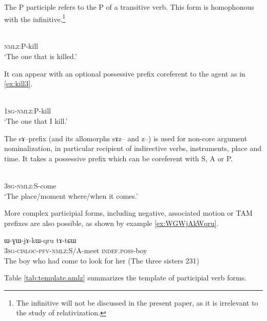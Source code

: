 \documentclass[oldfontcommands,oneside,a4paper,11pt]{article}
\newcommand{\ipa}[1]{{\phon #1}} %
\begin{document}
The P participle refers to the P of a transitive verb. This form is homophonous with the infinitive.\footnote{The infinitive will not be discussed in the present paper, as it is irrelevant to the study of relativization.}

 \begin{exe} 
\ex \label{ex:kill2}
\gll \ipa{kɤ-sat}    \\
   \textsc{nmlz}:P-kill \\
 \glt  `The one that is killed.'
 \end{exe}
 
It can appear with an optional possessive prefix coreferent to the agent as in \ref{ex:kill3}.
  
  \begin{exe}
\ex \label{ex:kill3}
\gll \ipa{a-kɤ-sat}    \\
   \textsc{1sg-nmlz}:P-kill \\
 \glt  `The one that I kill.'
 \end{exe}

The \ipa{sɤ}--prefix (and its allomorphs \ipa{sɤz}-- and \ipa{z}--) is used for non-core argument nominalization, in particular   recipient of indirective verbs, instruments, place and time. It takes a possessive prefix  which can be coreferent with S, A or P.

   \begin{exe}
\ex \label{ex:come}
\gll \ipa{ɯ-sɤ-ɣi}    \\
   \textsc{3sg-nmlz}:S-come \\
 \glt  `The place/moment where/when it comes.'
 \end{exe}
 
More complex participial forms, including negative, associated motion or TAM prefixes are also possible, as shown by example \ref{ex:WGWjAkWqru}.

 \begin{exe}
\ex \label{ex:WGWjAkWqru}
\gll
  	\ipa{ɯ-ɣɯ-jɤ-kɯ-qru}  	\ipa{tɤ-tɕɯ}  	   \\
  \textsc{3sg-cisloc-pfv-nmlz:}S/A-meet \textsc{indef.poss}-boy   \\
\glt The boy  who had come to look for her (The three sisters 231)
 \end{exe}

Table \ref{tab:template.nmlz} summarizes the template of participial verb forms.

\begin{table}[h]
\caption{The template of participial verb forms in Japhug} \centering \label{tab:template.nmlz}
\end{table}
\end{document}
